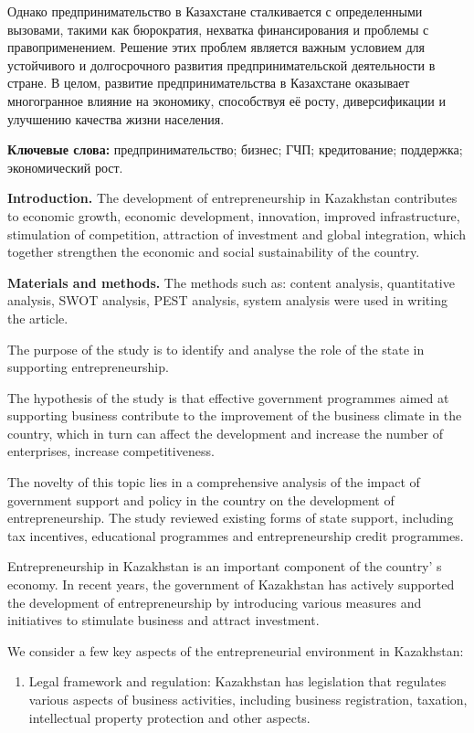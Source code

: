 Однако предпринимательство в Казахстане сталкивается с определенными
вызовами, такими как бюрократия, нехватка финансирования и проблемы с
правоприменением. Решение этих проблем является важным условием для
устойчивого и долгосрочного развития предпринимательской деятельности в
стране. В целом, развитие предпринимательства в Казахстане оказывает
многогранное влияние на экономику, способствуя её росту, диверсификации
и улучшению качества жизни населения.

{\bfseries Ключевые слова:} предпринимательство; бизнес; ГЧП; кредитование;
поддержка; экономический рост.

\begin{multicols}{2}
{\bfseries Introduction.} The development of entrepreneurship in Kazakhstan
contributes to economic growth, economic development, innovation,
improved infrastructure, stimulation of competition, attraction of
investment and global integration, which together strengthen the
economic and social sustainability of the country.

{\bfseries Materials and methods.} The methods such as: content analysis,
quantitative analysis, SWOT analysis, PEST analysis, system analysis
were used in writing the article.

The purpose of the study is to identify and analyse the role of the
state in supporting entrepreneurship.

The hypothesis of the study is that effective government programmes
aimed at supporting business contribute to the improvement of the
business climate in the country, which in turn can affect the
development and increase the number of enterprises, increase
competitiveness.

The novelty of this topic lies in a comprehensive analysis of the impact
of government support and policy in the country on the development of
entrepreneurship. The study reviewed existing forms of state support,
including tax incentives, educational programmes and entrepreneurship
credit programmes.

Entrepreneurship in Kazakhstan is an important component of the
country' s economy. In recent years, the government of
Kazakhstan has actively supported the development of entrepreneurship by
introducing various measures and initiatives to stimulate business and
attract investment.

We consider a few key aspects of the entrepreneurial environment in
Kazakhstan:

\begin{enumerate}
\def\labelenumi{\arabic{enumi}.}
\item
  Legal framework and regulation: Kazakhstan has legislation that
  regulates various aspects of business activities, including business
  registration, taxation, intellectual property protection and other
  aspects.
\end{enumerate}


\end{multicols}
